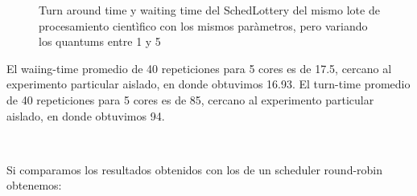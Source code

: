 \begin{figure}
\hfill
{}
\hfill
{}
\hfill
\caption{Turn around time y waiting time del SchedLottery del mismo lote de procesamiento cientìfico con los mismos paràmetros,
	pero variando los quantums entre 1 y 5}
\end{figure}

El waiing-time promedio de 40 repeticiones para 5 cores es de 17.5, cercano al experimento particular aislado, en donde obtuvimos 16.93.
El turn-time promedio de 40 repeticiones para 5 cores es de 85, cercano al experimento particular aislado, en donde obtuvimos 94.

~

Si comparamos los resultados obtenidos con los de un scheduler round-robin obtenemos:

